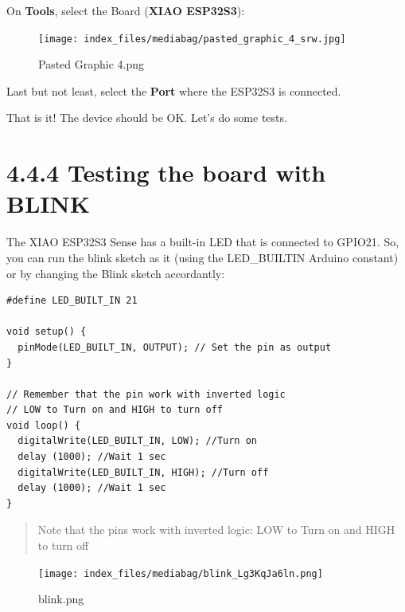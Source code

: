 \documentclass[
  letterpaper,
  DIV=11,
  numbers=noendperiod]{scrreprt}
\begin{document}
On \textbf{Tools}, select the Board (\textbf{XIAO ESP32S3}):

\begin{figure}[H]

{\centering \texttt{[image: index\_files/mediabag/pasted\_graphic\_4\_srw.jpg]}

}

\caption{Pasted Graphic 4.png}

\end{figure}

Last but not least, select the \textbf{Port} where the ESP32S3 is
connected.

That is it! The device should be OK. Let's do some tests.

\hypertarget{testing-the-board-with-blink-1}{%
\section*{4.4.4 Testing the board with
BLINK}\label{testing-the-board-with-blink-1}}


The XIAO ESP32S3 Sense has a built-in LED that is connected to GPIO21.
So, you can run the blink sketch as it (using the LED\_BUILTIN Arduino
constant) or by changing the Blink sketch accordantly:

\begin{verbatim}
#define LED_BUILT_IN 21 

void setup() {
  pinMode(LED_BUILT_IN, OUTPUT); // Set the pin as output
}

// Remember that the pin work with inverted logic
// LOW to Turn on and HIGH to turn off
void loop() {
  digitalWrite(LED_BUILT_IN, LOW); //Turn on
  delay (1000); //Wait 1 sec
  digitalWrite(LED_BUILT_IN, HIGH); //Turn off
  delay (1000); //Wait 1 sec
}
\end{verbatim}

\begin{quote}
Note that the pins work with inverted logic: LOW to Turn on and HIGH to
turn off
\end{quote}

\begin{figure}[H]

{\centering \texttt{[image: index\_files/mediabag/blink\_Lg3KqJa6ln.png]}

}

\caption{blink.png}

\end{figure}
\end{document}
